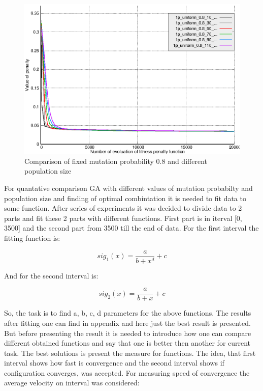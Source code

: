 \documentclass[12pt]{report}
\begin{document}
\begin{figure}
    \centering
    \includegraphics[width=5.0in]{mppscomparison08}
    \caption{Comparison of fixed mutation probability 0.8 and different population size}
    \label{mppscomparison08}
\end{figure}

For quantative comparison GA with different values of mutation probabilty and population size and finding of optimal combintation it is needed to fit data to some function. After series of experiments it was decided to divide data to 2 parts and fit these 2 parts with different functions. First part is in iterval [0, 3500] and the second part from 3500 till the end of data. For the first interval the fitting function is: 

\begin{equation} \label{sig1}
sig_1(x) = \frac{a}{b+x^d}+c
\end{equation}
\bigbreak

And for the second interval is:

\begin{equation} \label{sig2}
sig_2(x) = \frac{a}{b+x}+c
\end{equation}
\bigbreak

So, the task is to find a, b, c, d parameters for the above functions. The results after fitting  one can find in appendix and here just the best result is presented. But before presenting the result it is needed to introduce how one can compare different obtained functions and say that one is better then another for current task. The best solutions is present the measure for functions. The idea, that first interval shows how fast is convergence and the second interval shows if configuration converges, was accepted. For measuring speed of convergence the average velocity on interval was considered:
\end{document}
